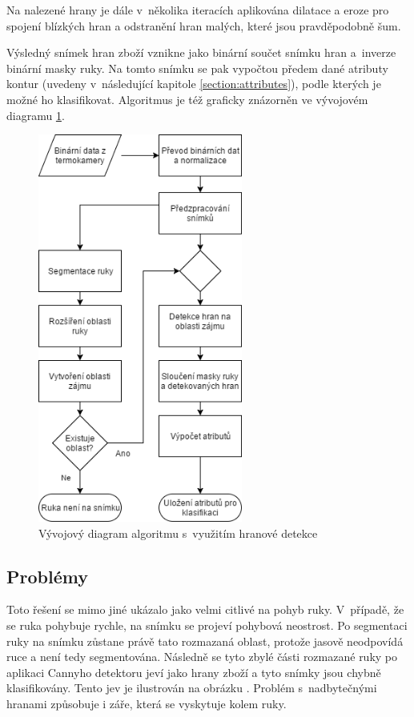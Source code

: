 Na nalezené hrany je dále v~několika iteracích aplikována dilatace a eroze pro spojení blízkých hran a odstranění hran malých, které jsou pravděpodobně šum. 

Výsledný snímek hran zboží vznikne jako binární součet snímku hran a~inverze binární masky ruky. Na tomto snímku se pak vypočtou předem dané atributy kontur (uvedeny v~následující kapitole \ref{section:attributes}), podle kterých je možné ho klasifikovat. Algoritmus je též graficky znázorněn ve vývojovém diagramu \ref{fig:edge_detection_diagram}.

\begin{figure}[h]
  \centering
  \includegraphics[width=0.6\textwidth]{images/edge_detection_diagram.png}
  \caption{Vývojový diagram algoritmu s~využitím hranové detekce}
  \label{fig:edge_detection_diagram}
\end{figure} 

    \subsection{Problémy}
    Toto řešení se mimo jiné ukázalo jako velmi citlivé na pohyb ruky. V~případě, že se ruka pohybuje rychle, na snímku se projeví pohybová neostrost. Po segmentaci ruky na snímku zůstane právě tato rozmazaná oblast, protože jasově neodpovídá ruce a není tedy segmentována. Následně se tyto zbylé části rozmazané ruky po aplikaci Cannyho detektoru jeví jako hrany zboží a tyto snímky jsou chybně klasifikovány. Tento jev je ilustrován na obrázku \todo{}. Problém s~nadbytečnými hranami způsobuje i záře, která se vyskytuje kolem ruky.

